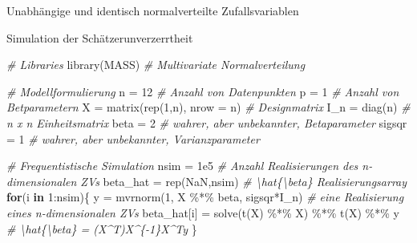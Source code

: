 \documentclass[
  8pt,
  ignorenonframetext,
]{beamer}
\newenvironment{Shaded}{\begin{snugshade}}{\end{snugshade}}
\newcommand{\AttributeTok}[1]{\textcolor[rgb]{0.77,0.63,0.00}{#1}}
\newcommand{\CommentTok}[1]{\textcolor[rgb]{0.56,0.35,0.01}{\textit{#1}}}
\newcommand{\ConstantTok}[1]{\textcolor[rgb]{0.00,0.00,0.00}{#1}}
\newcommand{\ControlFlowTok}[1]{\textcolor[rgb]{0.13,0.29,0.53}{\textbf{#1}}}
\newcommand{\DecValTok}[1]{\textcolor[rgb]{0.00,0.00,0.81}{#1}}
\newcommand{\FloatTok}[1]{\textcolor[rgb]{0.00,0.00,0.81}{#1}}
\newcommand{\FunctionTok}[1]{\textcolor[rgb]{0.00,0.00,0.00}{#1}}
\newcommand{\NormalTok}[1]{#1}
\newcommand{\OtherTok}[1]{\textcolor[rgb]{0.56,0.35,0.01}{#1}}
\newcommand{\SpecialCharTok}[1]{\textcolor[rgb]{0.00,0.00,0.00}{#1}}
\begin{document}
\begin{frame}[fragile]{Unabhängige und identisch normalverteilte
Zufallsvariablen}
\protect\hypertarget{unabhuxe4ngige-und-identisch-normalverteilte-zufallsvariablen-4}{}
\footnotesize

Simulation der Schätzerunverzerrtheit \vspace{2mm}

\footnotesize

\begin{Shaded}
\begin{Highlighting}[]
\CommentTok{\# Libraries}
\FunctionTok{library}\NormalTok{(MASS)                                      }\CommentTok{\# Multivariate Normalverteilung}

\CommentTok{\# Modellformulierung}
\NormalTok{n        }\OtherTok{=} \DecValTok{12}                                      \CommentTok{\# Anzahl von Datenpunkten}
\NormalTok{p        }\OtherTok{=} \DecValTok{1}                                       \CommentTok{\# Anzahl von Betparametern}
\NormalTok{X        }\OtherTok{=} \FunctionTok{matrix}\NormalTok{(}\FunctionTok{rep}\NormalTok{(}\DecValTok{1}\NormalTok{,n), }\AttributeTok{nrow =}\NormalTok{ n)              }\CommentTok{\# Designmatrix}
\NormalTok{I\_n      }\OtherTok{=} \FunctionTok{diag}\NormalTok{(n)                                 }\CommentTok{\# n x n Einheitsmatrix}
\NormalTok{beta     }\OtherTok{=} \DecValTok{2}                                       \CommentTok{\# wahrer, aber unbekannter, Betaparameter}
\NormalTok{sigsqr   }\OtherTok{=} \DecValTok{1}                                       \CommentTok{\# wahrer, aber unbekannter, Varianzparameter}

\CommentTok{\# Frequentistische Simulation}
\NormalTok{nsim     }\OtherTok{=} \FloatTok{1e5}                                     \CommentTok{\# Anzahl Realisierungen des n{-}dimensionalen ZVs}
\NormalTok{beta\_hat }\OtherTok{=} \FunctionTok{rep}\NormalTok{(}\ConstantTok{NaN}\NormalTok{,nsim)                           }\CommentTok{\# \textbackslash{}hat\{\textbackslash{}beta\} Realisierungsarray}
\ControlFlowTok{for}\NormalTok{(i }\ControlFlowTok{in} \DecValTok{1}\SpecialCharTok{:}\NormalTok{nsim)\{}
\NormalTok{  y           }\OtherTok{=} \FunctionTok{mvrnorm}\NormalTok{(}\DecValTok{1}\NormalTok{, X }\SpecialCharTok{\%*\%}\NormalTok{ beta, sigsqr}\SpecialCharTok{*}\NormalTok{I\_n) }\CommentTok{\# eine Realisierung eines n{-}dimensionalen ZVs}
\NormalTok{  beta\_hat[i] }\OtherTok{=} \FunctionTok{solve}\NormalTok{(}\FunctionTok{t}\NormalTok{(X) }\SpecialCharTok{\%*\%}\NormalTok{ X) }\SpecialCharTok{\%*\%} \FunctionTok{t}\NormalTok{(X) }\SpecialCharTok{\%*\%}\NormalTok{ y   }\CommentTok{\# \textbackslash{}hat\{\textbackslash{}beta\} = (X\^{}T)X\^{}\{{-}1\}X\^{}Ty }
\NormalTok{\}}


\end{Highlighting}
\end{Shaded}
\end{frame}
\end{document}
